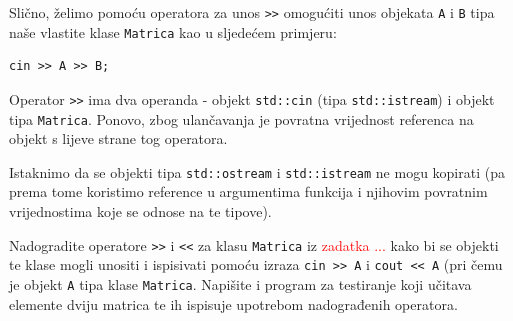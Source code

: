 Slično, želimo pomoću operatora za unos \texttt{>\!>}
omogućiti unos objekata \texttt{A} i \texttt{B}
tipa naše vlastite klase \texttt{Matrica} kao u sljedećem primjeru:

\begin{verbatim}
cin >> A >> B;
\end{verbatim}

Operator \texttt{>\!>} ima dva operanda - objekt \texttt{std::cin} (tipa \texttt{std::istream})
i objekt tipa \texttt{Matrica}.
Ponovo, zbog ulančavanja je povratna vrijednost referenca na objekt s lijeve strane tog operatora.
\medskip

Istaknimo da se objekti tipa \texttt{std::ostream} i \texttt{std::istream} ne mogu kopirati
(pa prema tome koristimo reference u argumentima funkcija i njihovim povratnim vrijednostima
koje se odnose na te tipove).


\begin{zadatak}\label{zad:operator-unos-i-ispis}
Nadogradite operatore \texttt{>\!>} i \texttt{<\!<} za klasu
\texttt{Matrica} iz \textcolor{red}{zadatka ...} 
kako bi se objekti te klase mogli unositi
i ispisivati pomoću izraza \texttt{cin >\!> A} i \texttt{cout <\!< A}
(pri čemu je objekt \texttt{A} tipa klase \texttt{Matrica}.
Napišite i program za testiranje koji učitava elemente
dviju matrica te ih ispisuje upotrebom
nadograđenih operatora.
\end{zadatak}


